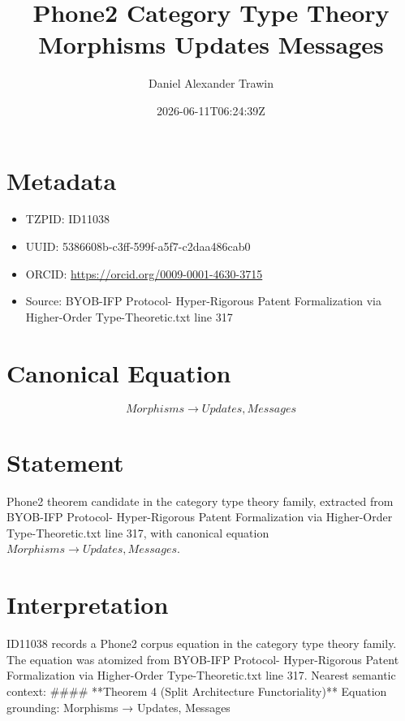 \documentclass[11pt]{article}
\title{Phone2 Category Type Theory Morphisms Updates Messages}
\author{Daniel Alexander Trawin}
\date{2026-06-11T06:24:39Z}
\begin{document}
\maketitle
\section*{Metadata}
\begin{itemize}
\item TZPID: ID11038
\item UUID: 5386608b-c3ff-599f-a5f7-c2daa486cab0
\item ORCID: \url{https://orcid.org/0009-0001-4630-3715}
\item Source: BYOB-IFP Protocol- Hyper-Rigorous Patent Formalization via Higher-Order Type-Theoretic.txt line 317
\end{itemize}
\section*{Canonical Equation}
\[
Morphisms → {Updates, Messages}
\]
\section*{Statement}
Phone2 theorem candidate in the category type theory family, extracted from BYOB-IFP Protocol- Hyper-Rigorous Patent Formalization via Higher-Order Type-Theoretic.txt line 317, with canonical equation $Morphisms → {Updates, Messages}$.
\section*{Interpretation}
ID11038 records a Phone2 corpus equation in the category type theory family. The equation was atomized from BYOB-IFP Protocol- Hyper-Rigorous Patent Formalization via Higher-Order Type-Theoretic.txt line 317. Nearest semantic context: #### **Theorem 4 (Split Architecture Functoriality)** Equation grounding: Morphisms → {Updates, Messages}
\end{document}
